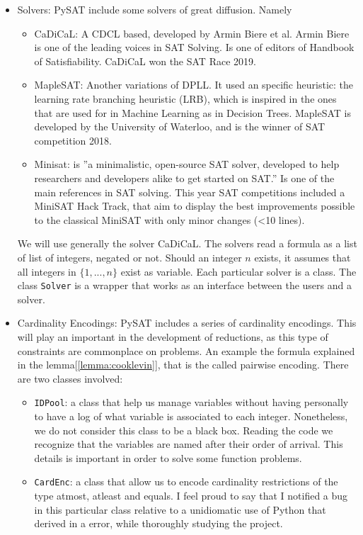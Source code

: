 \begin{itemize}
\item Solvers:  PySAT include some solvers of great diffusion. Namely
  \begin{itemize}
  \item CaDiCaL: A CDCL based, developed by Armin Biere et al. Armin Biere is one of the leading voices in SAT Solving. Is one of editors of Handbook of Satisfiability. CaDiCaL won the SAT Race 2019.
  \item MapleSAT: Another variations of DPLL. It used an specific heuristic: the learning rate branching heuristic (LRB), which is inspired in the ones that are used for in Machine Learning as in Decision Trees. MapleSAT is developed by the University of Waterloo, and is the winner of SAT competition 2018.
  \item Minisat: is ''a minimalistic, open-source SAT solver, developed to help researchers and developers alike to get started on SAT.'' Is one of the main references in SAT solving. This year SAT competitions included a MiniSAT Hack Track, that aim to display the best improvements possible to the classical MiniSAT with only minor changes (<10 lines).
  \end{itemize}

  We will use generally the solver CaDiCaL. The solvers read a formula as a list of list of integers, negated or not. Should an integer $n$ exists, it assumes that all integers in $\{1,...,n\}$ exist as variable. Each particular solver is a class. The class \texttt{Solver} is a wrapper that works as an interface between the users and a solver. 


  
\item Cardinality Encodings: PySAT includes a series of cardinality encodings.  This will play an important in the development of reductions, as this type of constraints are commonplace on problems. An example the formula explained in the lemma[\ref{lemma:cooklevin}], that is the called pairwise encoding. There are two classes involved:
  \begin{itemize}
  \item \texttt{IDPool}: a class that help us manage variables without having personally to have a log of what variable is associated to each integer. Nonetheless, we do not consider this class to be a black box. Reading the code we recognize that the variables are named after their order of arrival. This details is important in order to solve some function problems.
  \item \texttt{CardEnc}: a class that allow us to encode cardinality restrictions of the type atmost, atleast and equals. I feel proud to say that I notified a bug in this particular class relative to a unidiomatic use of Python that derived in a error, while thoroughly studying the project.  
  \end{itemize}

\end{itemize}


